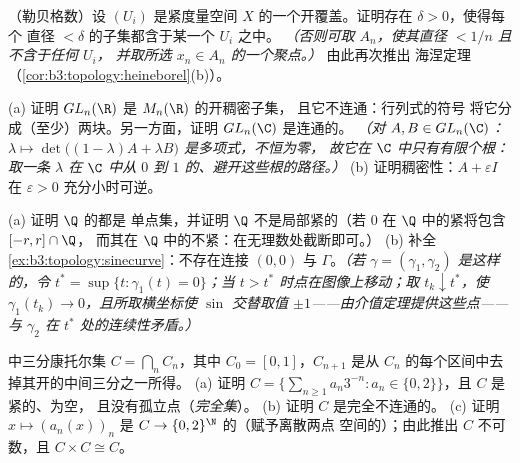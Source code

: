\begin{exercise}[$\star\star$]\label{exo:b3:topology:7}
（勒贝格数）设 $(U_i)$ 是紧度量空间
$X$ 的一个开覆盖。证明存在 $\delta > 0$，使得每个
直径 $< \delta$ 的子集都含于某一个 $U_i$ 之中。
\emph{（否则可取 $A_n$，使其直径 $< 1/n$ 且不含于任何 $U_i$，
并取所选 $x_n \in A_n$ 的一个聚点。）} 由此再次推出
海涅定理（\cref{cor:b3:topology:heineborel}(b)）。
\end{exercise}

\begin{exercise}[$\star\star$]\label{exo:b3:topology:8}
(a) 证明 $GL_n(\R)$ 是 $M_n(\R)$ 的开稠密子集，
且它不连通：行列式的符号
将它分成（至少）两块。另一方面，证明
$GL_n(\C)$ 是连通的。
\emph{（对 $A, B \in GL_n(\C)$：$\lambda \mapsto \det\bigl((1 -
\lambda)A + \lambda B\bigr)$ 是多项式，不恒为零，
故它在 $\C$ 中只有有限个根：取一条
$\lambda$ 在 $\C$ 中从 $0$ 到 $1$ 的、避开这些根的路径。）}
(b) 证明稠密性：$A + \varepsilon I$ 在
$\varepsilon > 0$ 充分小时可逆。
\end{exercise}

\begin{exercise}[$\star\star$]\label{exo:b3:topology:9}
(a) 证明 $\Q$ 的都是
单点集，并证明 $\Q$ 不是局部紧的（若
$0$ 在 $\Q$ 中的紧将包含 $[-r, r]\cap\Q$，
而其在 $\Q$ 中的不紧：在无理数处截断即可。）
(b) 补全\cref{ex:b3:topology:sinecurve}：不存在连接
$(0,0)$ 与 $\Gamma$。\emph{（若 $\gamma = (\gamma_1, \gamma_2)$
是这样的，令 $t^* = \sup\{t : \gamma_1(t) = 0\}$；当 $t
> t^*$ 时点在图像上移动；取 $t_k \downarrow
t^*$，使 $\gamma_1(t_k) \to 0$，且所取横坐标使 $\sin$
交替取值 $\pm1$——由介值定理提供这些点——
与 $\gamma_2$ 在
$t^*$ 处的连续性矛盾。）}
\end{exercise}

\begin{exercise}[$\star\star\star$]\label{exo:b3:topology:10}
中三分康托尔集 $C = \bigcap_n C_n$，其中 $C_0 =
[0,1]$，$C_{n+1}$ 是从
$C_n$ 的每个区间中去掉其开的中间三分之一所得。
(a) 证明 $C = \bigl\{\sum_{n\geq1} a_n3^{-n} : a_n \in
\{0,2\}\bigr\}$，且 $C$ 是紧的、为空，
且没有孤立点（\emph{完全集}）。
(b) 证明 $C$ 是完全不连通的。
(c) 证明 $x \mapsto (a_n(x))_n$ 是 $C \to
\{0,2\}^\N$ 的（赋予离散两点
空间的）；由此推出 $C$ 不可数，且 $C \times C
\cong C$。
\end{exercise}

